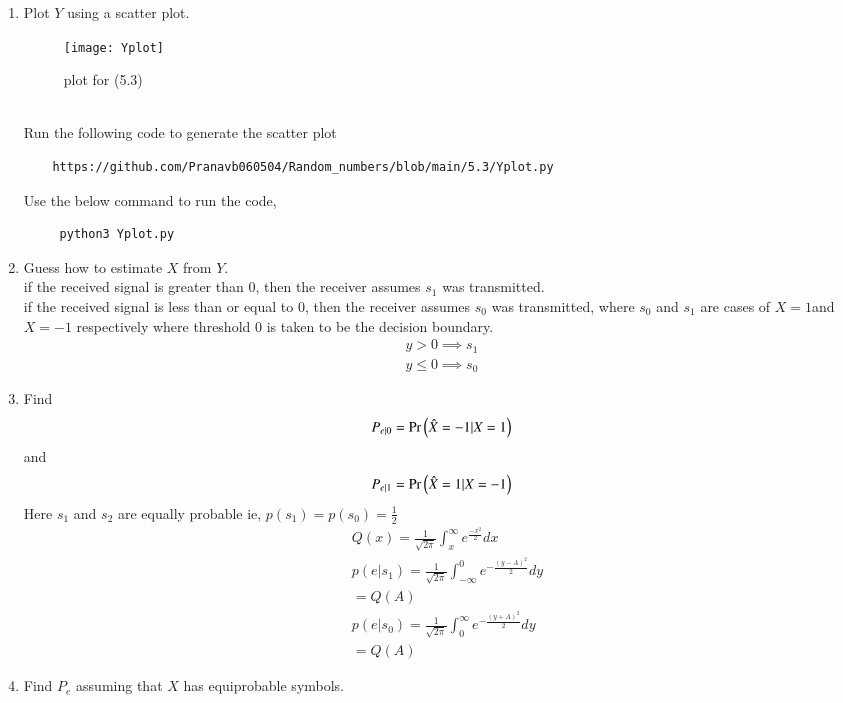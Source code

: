 \documentclass[journal,12pt,twocolumn]{IEEEtran}
\renewcommand\thesection{\arabic{section}}
\begin{document}
\begin{enumerate}[label=\thesection.\arabic*
,ref=\thesection.\theenumi]
\item Plot $Y$ using a scatter plot.\\
	\solution
	\begin{figure}[h]
\texttt{[image: Yplot]}
\caption{plot for (5.3)}
\label{fig:Y_Plot}
\end{figure}
\\
	Run the following code to generate the scatter plot
	\begin{lstlisting}
	https://github.com/Pranavb060504/Random_numbers/blob/main/5.3/Yplot.py
	\end{lstlisting}
	Use the below command to run the code,
	\begin{lstlisting}
     python3 Yplot.py 
	\end{lstlisting}
\item Guess how to estimate $X$ from $Y$.\\
	\solution
	if the received signal is greater than 0, then the receiver assumes $s_1$ was transmitted.\\
if the received signal is less than or equal to 0, then the receiver assumes $s_0$ was transmitted, where $s_0$ and $s_1$ are cases of $X=1$and $X=-1$ respectively where threshold 0 is taken to be the decision boundary.
\begin{align}
y>0 \implies s_1\\
y\leq 0 \implies s_0
\end{align}
\item
\label{ml-ch4_sim}
Find 
\begin{equation}
	P_{e|0} = \Pr\left(\hat{X} = -1|X=1\right)
\end{equation}
and 
\begin{equation}
	P_{e|1} = \Pr\left(\hat{X} = 1|X=-1\right)
\end{equation}
\solution 
Here $s_1$ and $s_2$ are equally probable ie, $p(s_1)=p(s_0)=\frac{1}{2}$ \\
\begin{align}
&Q(x)=\frac{1}{\sqrt{2\pi}} \int_{x}^{\infty} e^{\frac{-x^{2}}{2} } dx\\
&p(e|s_1)=\frac{1}{\sqrt{2 \pi}} \int_{-\infty}^{0} e^{-\frac{(y-A)^2}{2}} dy
\nonumber \\
&=Q(A)\\
&p(e|s_0)=\frac{1}{\sqrt{2 \pi}} \int_{0}^{\infty} e^{-\frac{(y+A)^{2}}{2}} dy
\nonumber \\
&=Q(A)
\end{align}
%
\item Find $P_e$ assuming that $X$ has equiprobable symbols.\\

\end{enumerate}
\end{document}
